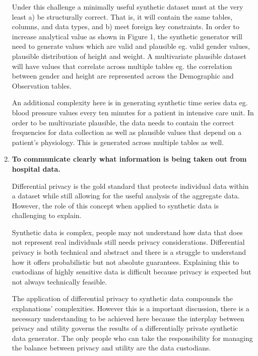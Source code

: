 \documentclass[11pt]{article}
\begin{document}
\begin{enumerate}[leftmargin=*]
    Under this challenge a minimally useful synthetic dataset must at the very least a) be structurally correct. That is, it will contain the same tables, columns, and data types, and b) meet foreign key constraints. In order to increase analytical value as shown in Figure 1, the synthetic generator will need to generate values which are valid and plausible eg. valid gender values, plausible distribution of height and weight.  A multivariate plausible dataset will have values that correlate across multiple tables eg. the correlation between gender and height are represented across the Demographic and Observation tables. 
    
    An additional complexity here is in generating synthetic time series data eg. blood pressure values every ten minutes for a patient in intensive care unit. In order to be multivariate plausible, the data needs to contain the correct frequencies for data collection as well as plausible values that depend on a patient's physiology. This is generated across multiple tables as well.  

    \item \textbf{To communicate clearly what information is being taken out from hospital data.
    }
    
    Differential privacy is the gold standard that protects individual data within a dataset while still allowing for the useful analysis of the aggregate data. However, the role of this concept when applied to synthetic data is challenging to explain. 
    
    Synthetic data is complex, people may not understand how data that does not represent real individuals still needs privacy considerations. Differential privacy is both technical and abstract and there is a struggle to understand how it offers probabilistic but not absolute guarantees. Explaining this to custodians of highly sensitive data is difficult because privacy is expected but not always technically feasible.
    
    The application of differential privacy to synthetic data compounds the explanations' complexities. However this is a important discussion, there is a necessary understanding to be achieved here because the interplay between privacy and utility governs the results of a differentially private synthetic data generator. The only people who can take the responsibility for managing the balance between privacy and utility are the data custodians.
\end{enumerate}
\end{document}
